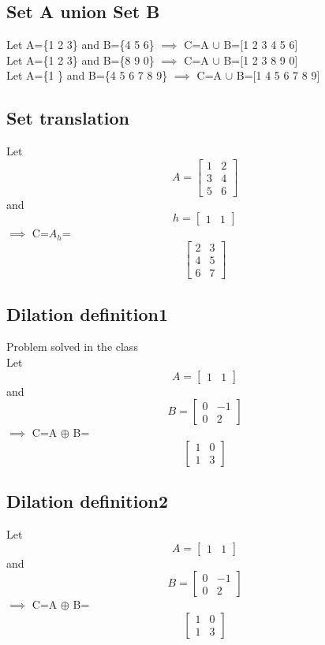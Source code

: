 \documentclass{article}
\begin{document}
    \subsection{ Set A union Set B}
    Let A=\{1 2 3\} and B=\{4 5 6\} $\implies$ C=A $\cup$ B=[1 2 3 4 5 6]\\
    Let A=\{1 2 3\} and B=\{8 9 0\} $\implies$ C=A $\cup$ B=[1 2 3 8 9 0]\\
    Let A=\{1 \} and B=\{4 5 6 7 8 9\} $\implies$ C=A $\cup$ B=[1 4 5 6 7 8 9]\\
    \subsection{Set translation}
    Let \[
    A=
    \begin{bmatrix} 
    1 & 2 \\
    3 & 4 \\
    5 & 6
    \end{bmatrix}
    \]
     and \[h=\begin{bmatrix} 1 & 1
     \end{bmatrix}
     \]
     $\implies$ 
     C=$A_h$=\[
     \begin{bmatrix}
     2 & 3\\
     4 & 5\\
     6 & 7
     \end{bmatrix}
     \]
     \subsection{Dilation definition1}
     Problem solved in the class\\
     Let \[
    A=
    \begin{bmatrix} 
    1 & 1
    \end{bmatrix}
    \]
     and \[B=\begin{bmatrix} 0 & -1\\
     0 & 2
     \end{bmatrix}
     \]
     $\implies$ C=A $\oplus$ B=
     \[
     \begin{bmatrix}
     1 & 0\\
     1 & 3
     \end{bmatrix}
     \]
     \subsection{Dilation definition2}
     Let \[
    A=
    \begin{bmatrix} 
    1 & 1
    \end{bmatrix}
    \]
     and \[B=\begin{bmatrix} 0 & -1\\
     0 & 2
     \end{bmatrix}
     \]
     $\implies$ C=A $\oplus$ B=
     \[
     \begin{bmatrix}
     1 & 0\\
     1 & 3
     \end{bmatrix}
     \]
\end{document}
